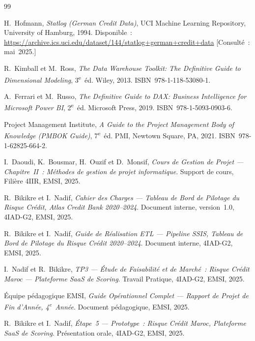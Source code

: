 \documentclass[12pt, a4paper]{report}
\begin{document}
\begin{thebibliography}{99}

H.~Hofmann,
\textit{Statlog (German Credit Data)},
UCI Machine Learning Repository, University of Hamburg, 1994.
Disponible~: \url{https://archive.ics.uci.edu/dataset/144/statlog+german+credit+data}
[Consulté~: mai~2025.]

R.~Kimball et M.~Ross,
\textit{The Data Warehouse Toolkit: The Definitive Guide to Dimensional Modeling},
3\textsuperscript{e}~éd. Wiley, 2013. ISBN~978-1-118-53080-1.

A.~Ferrari et M.~Russo,
\textit{The Definitive Guide to DAX: Business Intelligence for Microsoft Power BI},
2\textsuperscript{e}~éd. Microsoft Press, 2019. ISBN~978-1-5093-0903-6.

Project Management Institute,
\textit{A Guide to the Project Management Body of Knowledge (PMBOK Guide)},
7\textsuperscript{e}~éd. PMI, Newtown Square, PA, 2021. ISBN~978-1-62825-664-2.

I.~Daoudi, K.~Bousmar, H.~Ouzif et D.~Monsif,
\textit{Cours de Gestion de Projet --- Chapitre~II~: Méthodes de gestion de projet informatique}.
Support de cours, Filière 4IIR, EMSI, 2025.

R.~Bikikre et I.~Nadif,
\textit{Cahier des Charges --- Tableau de Bord de Pilotage du Risque Crédit, Atlas Credit Bank 2020--2024}.
Document interne, version~1.0, 4IAD-G2, EMSI, 2025.

R.~Bikikre et I.~Nadif,
\textit{Guide de Réalisation ETL --- Pipeline SSIS, Tableau de Bord de Pilotage du Risque Crédit 2020--2024}.
Document interne, 4IAD-G2, EMSI, 2025.

I.~Nadif et R.~Bikikre,
\textit{TP3 --- Étude de Faisabilité et de Marché~: Risque Crédit Maroc --- Plateforme SaaS de Scoring}.
Travail Pratique, 4IAD-G2, EMSI, 2025.

Équipe pédagogique EMSI,
\textit{Guide Opérationnel Complet --- Rapport de Projet de Fin d'Année, 4\textsuperscript{e}~Année}.
Document pédagogique, EMSI, 2025.

R.~Bikikre et I.~Nadif,
\textit{Étape~5 --- Prototype~: Risque Crédit Maroc, Plateforme SaaS de Scoring}.
Présentation orale, 4IAD-G2, EMSI, 2025.


\end{thebibliography}
\end{document}
